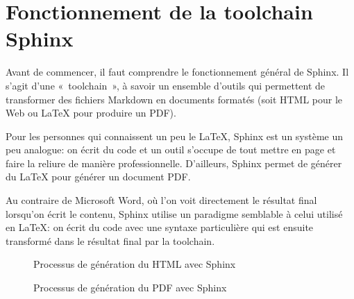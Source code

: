 \documentclass[a4,10pt,french]{sphinxmanual}
\begin{document}
\section{Fonctionnement de la toolchain Sphinx}
\label{\detokenize{tutoriel-sphinx/fonctionnement:fonctionnement-de-la-toolchain-sphinx}}\label{\detokenize{tutoriel-sphinx/fonctionnement::doc}}
\sphinxAtStartPar
Avant de commencer, il faut comprendre le fonctionnement général de Sphinx. Il
s’agit d’une « toolchain », à savoir un ensemble d’outils qui permettent de
transformer des fichiers Markdown en documents formatés (soit HTML pour le Web
ou LaTeX pour produire un PDF).

\sphinxAtStartPar
Pour les personnes qui connaissent un peu le LaTeX, Sphinx est un système un peu
analogue: on écrit du code et un outil s’occupe de tout mettre en page et faire
la reliure de manière professionnelle. D’ailleurs, Sphinx permet de générer du
LaTeX pour générer un document PDF.

\sphinxAtStartPar
Au contraire de Microsoft Word, où l’on voit directement le résultat final
lorsqu’on écrit le contenu, Sphinx utilise un paradigme semblable à celui
utilisé en LaTeX: on écrit du code avec une syntaxe particulière qui est ensuite
transformé dans le résultat final par la toolchain.

\begin{figure}[htbp]
\centering
\capstart

\noindent{}
\caption{Processus de génération du HTML avec Sphinx}\label{\detokenize{tutoriel-sphinx/fonctionnement:id1}}\end{figure}

\begin{figure}[htbp]
\centering
\capstart

\noindent{}
\caption{Processus de génération du PDF avec Sphinx}\label{\detokenize{tutoriel-sphinx/fonctionnement:id2}}\end{figure}
\end{document}
